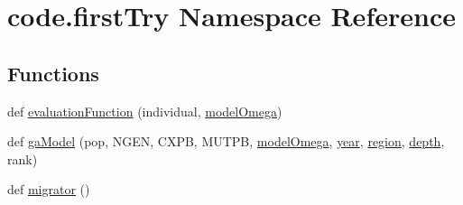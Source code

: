 \hypertarget{namespacecode_1_1first_try}{}\section{code.\+first\+Try Namespace Reference}
\label{namespacecode_1_1first_try}
\subsection*{Functions}
\begin{DoxyCompactItemize}
\item 
def \hyperlink{namespacecode_1_1first_try_afc7255c9742cd3469c0ea53e9b675deb}{evaluation\+Function} (individual, \hyperlink{namespacecode_1_1first_try_a461ee0676d457c2365142f11ebf83368}{model\+Omega})
\item 
def \hyperlink{namespacecode_1_1first_try_ac457596b9fc7cbbb50f3a1a1274deaa7}{ga\+Model} (pop, N\+G\+EN, C\+X\+PB, M\+U\+T\+PB, \hyperlink{namespacecode_1_1first_try_a461ee0676d457c2365142f11ebf83368}{model\+Omega}, \hyperlink{namespacecode_1_1first_try_aaa285209df845cddc4378d35e19ecc54}{year}, \hyperlink{namespacecode_1_1first_try_a55a54b51227afc77253859ddda04e28f}{region}, \hyperlink{namespacecode_1_1first_try_a09aa59991482f93e58d6df9df2be3e1d}{depth}, rank)
\item 
def \hyperlink{namespacecode_1_1first_try_a87aef408b21da9d559ce14b61403bf0f}{migrator} ()
\end{DoxyCompactItemize}
